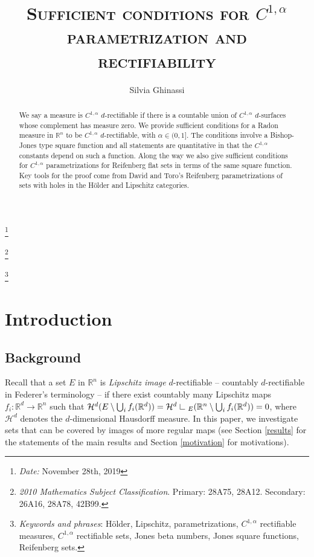 \documentclass[11pt, twoside, leqno]{article}
\title{\textsc{Sufficient conditions for $C^{1,\alpha}$ parametrization and rectifiability}}
\author{Silvia Ghinassi}
\date{}
\newcommand\blfootnote[1]{%
  \begingroup
  \renewcommand\thefootnote{}\footnote{#1}%
  \addtocounter{footnote}{-1}%
  \endgroup
}
\numberwithin{equation}{section}
\theoremstyle{plain}
\theoremstyle{definition}
\newcommand{\R}{\mathbb{R}}
\newcommand{\res}{\hbox{ {\vrule height .22cm}{\leaders\hrule\hskip.2cm} }} %
\begin{document}
\maketitle


\begin{abstract}

We say a measure is $C^{1,\alpha}$ $d$-rectifiable if there is a countable union of $C^{1,\alpha}$ $d$-surfaces whose complement has measure zero. We provide sufficient conditions for a Radon measure in $\R^n$ to be $C^{1,\alpha}$ $d$-rectifiable, with $\alpha \in (0,1]$. The conditions involve a Bishop-Jones type square function and all statements are quantitative in that the $C^{1,\alpha}$ constants depend on such a function. Along the way we also give sufficient conditions for $C^{1,\alpha}$ parametrizations for Reifenberg flat sets in terms of the same square function. Key tools for the proof come from David and Toro's Reifenberg parametrizations of sets with holes in the H\"{o}lder and Lipschitz categories. 
\end{abstract}
\blfootnote{\emph{Date:} November 28th, 2019}
\blfootnote{\emph{2010 Mathematics Subject Classification}. Primary: 28A75, 28A12. Secondary: 26A16, 28A78, 42B99.}
%
\blfootnote{\emph{Keywords and phrases}: H\"{o}lder, Lipschitz, parametrizations, $C^{1,\alpha}$ rectifiable measures, $C^{1,\alpha}$ rectifiable sets,  Jones beta numbers, Jones square functions, Reifenberg sets.}

\section{Introduction}


\subsection{Background}


Recall that a set $E$ in $\R^n$ is \emph{Lipschitz image} $d$-rectifiable -- countably $d$-rectifiable in Federer's terminology -- if there exist countably many Lipschitz maps $f_i \colon \R^d \to \R^n$ such that $\mathcal{H}^d( E \setminus \bigcup_i f_i(\R^d))=\mathcal{H}^d\res_E( \R^n \setminus \bigcup_i f_i(\R^d))=0$, where $\mathcal{H}^d$ denotes the $d$-dimensional Hausdorff measure.
In this paper, we investigate sets that can be covered by images of more regular maps (see Section \ref{results} for the statements of the main results and Section \ref{motivation} for motivations).
\end{document}
